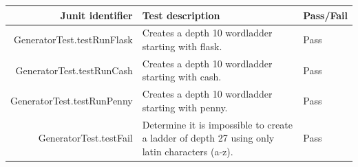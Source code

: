 \documentclass[11pt]{article} %
\begin{document}
\begin{table}[h!!]
\begin{tabularx}{\linewidth}{| r | X | l |}
\hline
Junit identifier & Test description & Pass/Fail\\
\hline
GeneratorTest.testRunFlask & Creates a depth 10 wordladder starting with flask. & Pass \\
GeneratorTest.testRunCash & Creates a depth 10 wordladder starting with cash. & Pass \\
GeneratorTest.testRunPenny & Creates a depth 10 wordladder starting with penny. & Pass \\
GeneratorTest.testFail & Determine it is impossible to create a ladder of depth 27 using only latin characters (a-z). & Pass\\
\hline
\end{tabularx}
\end{table}
\end{document}
